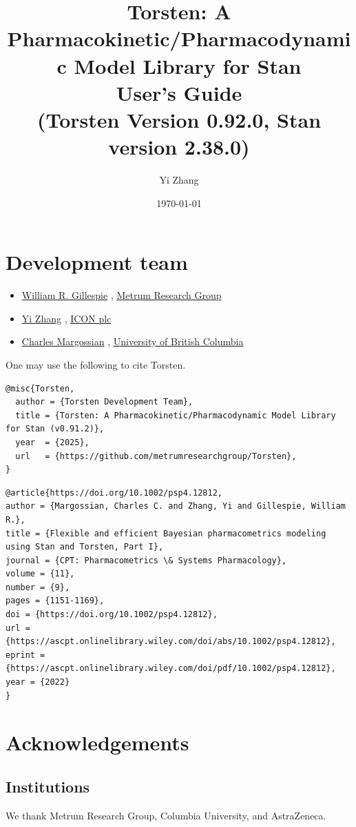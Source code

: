 \documentclass[12pt, reqno, oneside]{amsbook}
\author{Yi Zhang}
\date{\today}
\title{Torsten: A Pharmacokinetic/Pharmacodynamic Model Library for Stan\\\medskip
\large User's Guide \\  (Torsten Version 0.92.0, Stan version 2.38.0)}
\numberwithin{equation}{chapter}
\numberwithin{figure}{chapter}
\numberwithin{table}{chapter}
\theoremstyle{remark}
\begin{document}
\maketitle
\tableofcontents


\chapter*{Development team}
\label{sec:org5ae31e5}
\begin{itemize}
\item \href{}{William R. Gillespie} , \href{https://www.metrumrg.com/}{Metrum Research Group}
\item \href{mailto:yz@yizh.org}{Yi Zhang} , \href{https://www.iconplc.com/solutions/technologies/nonmem/}{ICON plc}
\item \href{charles.margossian@stat.ubc.ca}{Charles Margossian} , \href{https://www.stat.ubc.ca/}{University of British Columbia}
\end{itemize}

\vspace{1in}

One may use the following to cite Torsten.
\begin{verbatim}
@misc{Torsten,
  author = {Torsten Development Team},
  title = {Torsten: A Pharmacokinetic/Pharmacodynamic Model Library for Stan (v0.91.2)},
  year  = {2025},
  url   = {https://github.com/metrumresearchgroup/Torsten},
}
\end{verbatim}

\begin{verbatim}
@article{https://doi.org/10.1002/psp4.12812,
author = {Margossian, Charles C. and Zhang, Yi and Gillespie, William R.},
title = {Flexible and efficient Bayesian pharmacometrics modeling using Stan and Torsten, Part I},
journal = {CPT: Pharmacometrics \& Systems Pharmacology},
volume = {11},
number = {9},
pages = {1151-1169},
doi = {https://doi.org/10.1002/psp4.12812},
url = {https://ascpt.onlinelibrary.wiley.com/doi/abs/10.1002/psp4.12812},
eprint = {https://ascpt.onlinelibrary.wiley.com/doi/pdf/10.1002/psp4.12812},
year = {2022}
}
\end{verbatim}

\chapter*{Acknowledgements}
\label{sec:orgab46cef}
\section*{Institutions}
\label{sec:orgb690148}
We thank Metrum Research Group, Columbia University, and AstraZeneca.
\end{document}
